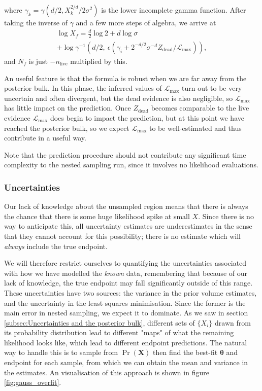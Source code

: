 \documentclass[usenatbib]{mnras}
\newcommand{\thetab}{\bm{\theta}}
\newcommand{\set}[1]{\{#1\}}
\newcommand{\nlive}{n_\mathrm{live}}
\newcommand{\Like}{\mathcal{L}}
\begin{document}
where $\gamma_k = \gamma\left(d/2, X_k^{2/d}/2\sigma^2\right)$ is the lower incomplete gamma function. After taking the inverse of  $\gamma$ and a few more steps of algebra, we arrive at
\begin{multline}
	\log X_f = \frac{d}{2}\log 2 + d \log \sigma \\
	+ \log \gamma^{-1} \left( d/2 ,\ \epsilon \left(\gamma_i+ 2^{-d/2} \sigma^{-d} Z_\mathrm{dead}/\Like_\mathrm{max}\right)\right),
\end{multline}
and $N_f$ is just  $-\nlive$ multiplied by this. 
\par
An useful feature is that the formula is robust when we are far away from the posterior bulk. In this phase, the inferred values of $\Like_\mathrm{max}$ turn out to be very uncertain and often divergent, but the dead evidence is also negligible, so $\Like_\mathrm{max}$ has little impact on the prediction. Once $Z_\mathrm{dead}$ becomes comparable to the live evidence $\Like_\mathrm{max}$ does begin to impact the prediction, but at this point we have reached the posterior bulk, so we expect $\Like_\mathrm{max}$ to be well-estimated and thus contribute in a useful way.
\par
Note that the prediction procedure should not contribute any significant time complexity to the nested sampling run, since it involves no likelihood evaluations. 

\subsubsection{Uncertainties}
Our lack of knowledge about the unsampled region means that there is always the chance that there is some huge likelihood spike at small $X$. Since there is no way to anticipate this, all uncertainty estimates are underestimates in the sense that they cannot account for this possibility; there is no estimate which will \textit{always} include the true endpoint. 
\par
We will therefore restrict ourselves to quantifying the uncertainties associated with how we have modelled the \textit{known} data, remembering that because of our lack of knowledge, the true endpoint may fall significantly outside of this range. These uncertainties have two sources: the variance in the prior volume estimates, and the uncertainty in the least squares minimisation. Since the former is the main error in nested sampling, we expect it to dominate. As we saw in section \ref{subsec:Uncertainties and the posterior bulk}, different sets of $\set{X_i}$ drawn from its probability distribution lead to different "maps" of what the remaining likelihood looks like, which lead to different endpoint predictions. The natural way to handle this is to sample from $\Pr(\bm{X})$ then find the best-fit  $\thetab$ and endpoint for each sample, from which we can obtain the mean and variance in the estimates. An visualisation of this approach is shown in figure \ref{fig:gauss_overfit}.
\end{document}
